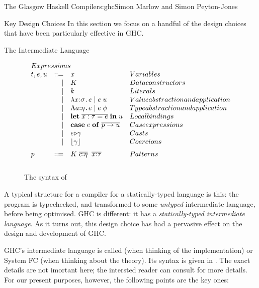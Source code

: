 \begin{aosachapter}{The Glasgow Haskell Compiler}{s:ghc}{Simon Marlow and Simon Peyton-Jones}
\begin{aosasect1}{Key Design Choices}
In this section we focus on a handful of the design choices that have
been particularly effective in GHC.

\begin{aosasect2}{The Intermediate Language}
\label{sec.ghc.core}

\begin{figure}
$$
\begin{array}{lrll}
\multicolumn{3}{l}{Expressions} \\
t,e,u & ::= & x  & Variables \\
      & \mid & K & Data constructors \\ 
      & \mid & k & Literals \\
      & \mid & \lambda x{:}\sigma \code{.} e \mid e\;u 
             & Value abstraction and application \\ 
    & \mid   &  \Lambda a{:}\eta \code{.} e \mid e\;\phi
             & Type abstraction and application \\ 
    & \mid    & \mathbf{let}\;\ol{x:\tau = e}\;\mathbf{in}\;u 
             & Local bindings \\ 
    & \mid    & \tcase{e}{p \to u} 
             & Case expressions \\
    & \mid    & \tcast{e}{\gamma}         &  Casts \\
    & \mid    & \clift{\gamma}            &  Coercions \\[2mm] 
 p  & ::=     & K\; \ol{c{:}\eta}\;\;\ol{x{:}\tau} & Patterns \\[3mm]
\end{array} 
$$
\caption{The syntax of }\label{fig.ghc.coresyntax}
\end{figure}

A typical structure for a compiler for a statically-typed language is
this: the program is typechecked, and transformed to some
\emph{untyped} intermediate language, before being optimised.  GHC is
different: it has a \emph{statically-typed intermediate language}.  As
it turns out, this design choice has had a pervasive effect on the
design and development of GHC.

GHC's intermediate language is called  (when thinking of
the implementation) or System FC (when thinking about the theory).
Its syntax is given in .  The exact
details are not imortant here; the intersted reader can consult
\cite{bib:sulzmann} for more details.  For our present purposes,
however, the following points are the key ones:


\end{aosasect2}
\end{aosasect1}
\end{aosachapter}
